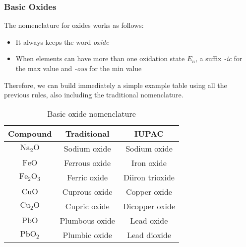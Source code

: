 \documentclass[../qm.tex]{subfiles}
\begin{document}
\subsubsection{Basic Oxides}
The nomenclature for oxides works as follows:
\begin{itemize}
\item It always keeps the word \textit{oxide}
\item When elements can have more than one oxidation state $E_n$, a suffix \textit{-ic} for the max value and \textit{-ous} for the min value
\end{itemize}
Therefore, we can build immediately a simple example table using all the previous rules, also including the traditional nomenclature. 
\begin{table}[H]
	\centering
	\begin{tabular}{c|c|c}
		Compound&Traditional&IUPAC\\
		\hline
		$\mathrm{Na_2O}$&Sodium oxide&Sodium oxide\\\hline
		$\mathrm{FeO}$&Ferrous oxide&Iron oxide\\\hline
		$\mathrm{Fe_2O_3}$&Ferric oxide&Diiron trioxide\\\hline
		$\mathrm{CuO}$&Cuprous oxide&Copper oxide\\\hline
		$\mathrm{Cu_2O}$&Cupric oxide&Dicopper oxide\\\hline
		$\mathrm{PbO}$&Plumbous oxide&Lead oxide\\\hline
		$\mathrm{PbO_2}$&Plumbic oxide&Lead dioxide\\\hline
	\end{tabular}
	\caption{Basic oxide nomenclature}
	\label{tab:oxides.chem}
\end{table}
\end{document}
